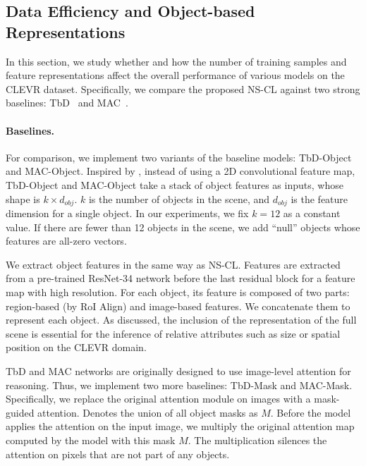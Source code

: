 \documentclass{article} \usepackage{iclr2019_conference,times}
\newcommand{\model}{NS-CL\xspace}
\newcommand{\revisioncolor}{}
\begin{document}
{
\revisioncolor
\subsection{Data Efficiency and Object-based Representations}
\label{sec:app:efficiency}
In this section, we study whether and how the number of training samples and feature representations affect the overall performance of various models on the CLEVR dataset. Specifically, we compare the proposed NS-CL against two strong baselines: TbD~\citep{Mascharka2018Transparency} and MAC~\citep{Hudson2018Compositional}.

\paragraph{Baselines. } For comparison, we implement two variants of the baseline models: TbD-Object and MAC-Object. Inspired by \cite{Anderson2017BottomUp}, instead of using a 2D convolutional feature map, TbD-Object and MAC-Object take a stack of object features as inputs, whose shape is $k \times d_{obj}$. $k$ is the number of objects in the scene, and $d_{obj}$ is the feature dimension for a single object. In our experiments, we fix $k = 12$ as a constant value. If there are fewer than 12 objects in the scene, we add ``null'' objects whose features are all-zero vectors.

We extract object features in the same way as \model. Features are extracted from a pre-trained ResNet-34 network before the last residual block for a feature map with high resolution. For each object, its feature is composed of two parts: region-based (by RoI Align) and image-based features. We concatenate them to represent each object. As discussed, the inclusion of the representation of the full scene is essential for the inference of relative attributes such as size or spatial position on the CLEVR domain.

TbD and MAC networks are originally designed to use image-level attention for reasoning. Thus, we implement two more baselines: TbD-Mask and MAC-Mask. Specifically, we replace the original attention module on images with a mask-guided attention. Denotes the union of all object masks as $M$. Before the model applies the attention on the input image, we multiply the original attention map computed by the model with this mask $M$. The multiplication silences the attention on pixels that are not part of any objects.

}
\end{document}
